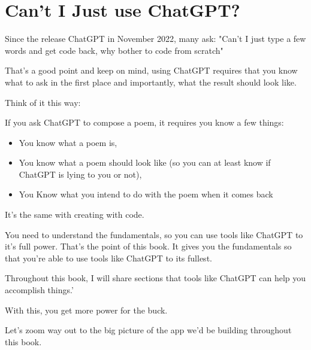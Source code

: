 \section{Can't I Just use ChatGPT?}\label{sec:why-not-chatgpt?}

Since the release ChatGPT in November 2022, many ask: "Can't I just type a few words and get code back,
why bother to code from scratch"

That's a good point and keep on mind,
using ChatGPT requires that you know what to ask in the first place and importantly, what the result should look like.

Think of it this way:

If you ask ChatGPT to compose a poem, it requires you know a few things:

\begin{itemize}
    \item You know what a poem is,
    \item You know what a poem should look like (so you can at least know if ChatGPT is lying to you or not),
    \item You Know what you intend to do with the poem when it comes back
\end{itemize}

It's the same with creating with code.

You need to understand the fundamentals, so you can use tools like ChatGPT to it's full power.
That's the point of this book.
It gives you the fundamentals so that you're able to use tools like ChatGPT to its fullest.

Throughout this book, I will share sections that tools like ChatGPT can help you accomplish things.'

With this, you get more power for the buck.

Let's zoom way out to the big picture of the app we'd be building throughout this book.



